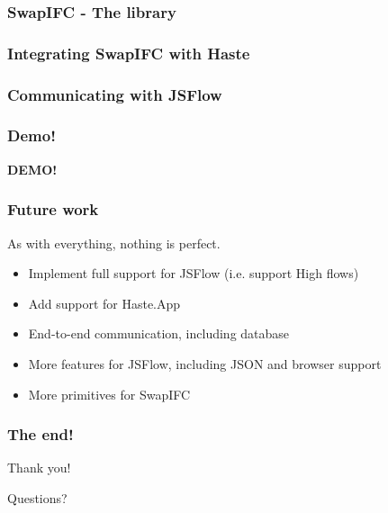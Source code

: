 \documentclass{beamer}
\begin{document}

\begin{frame}
  \frametitle{SwapIFC - The library}
  
\end{frame}


\begin{frame}
  \frametitle{Integrating SwapIFC with Haste}
  
\end{frame}


\begin{frame}
  \frametitle{Communicating with JSFlow}
  
\end{frame}


\begin{frame}
  \frametitle{Demo!}
  \centering
  \Huge \textbf{DEMO!}
\end{frame}


\begin{frame}
  \frametitle{Future work}
  As with everything, nothing is perfect. \pause
  \begin{itemize}
    \item Implement full support for JSFlow (i.e. support High flows) \pause
    \item Add support for Haste.App \pause
    \item End-to-end communication, including database \pause
    \item More features for JSFlow, including JSON and browser support \pause
    \item More primitives for SwapIFC
  \end{itemize}
\end{frame}


\begin{frame}
  \frametitle{The end!}
  \Huge
  \begin{center}
    Thank you!
  \end{center}
  \begin{center}
    Questions?
  \end{center}
\end{frame}

\end{document}
